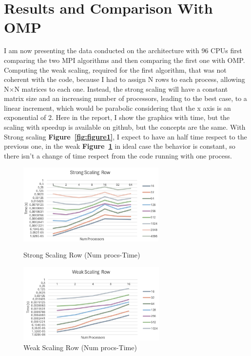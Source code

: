 \section{Results and Comparison With OMP}
I am now presenting the data conducted on the architecture with 96 CPUs first comparing the two MPI algorithms and then comparing the first one with OMP. Computing the weak scaling, required for the first algorithm, that was not coherent with the code, because I had to assign N rows to each process, allowing N$\times$N matrices to each one. Instead, the strong scaling will have a constant matrix size and an increasing number of processors, leading to the best case, to a linear increment, which would be parabolic considering that the x axis is an exponential of 2. Here in the report, I show the graphics with time, but the scaling with speedup is available on github, but the concepts are the same. With Strong scaling \textbf{Figure~\ref{fig:figure1}}, I expect to have an half time respect to the previous one, in the weak \textbf{Figure~\ref{fig:figure2}} in ideal case the behavior is constant, so there isn't a change of time respect from the code running with one process. 
\begin{figure}[h!]
    \centering
    \begin{minipage}[b]{1.0\columnwidth}
        \centering
        \includegraphics[width=\textwidth,height=4cm,keepaspectratio=false]{images/1.02 Strong Scaling Row.png}
        \caption{Strong Scaling Row (Num procs-Time)}
        \label{fig:figure1}
    \end{minipage}
    \hfill
    \begin{minipage}[b]{1.0\columnwidth}
        \centering
        \includegraphics[width=\textwidth,height=4cm,keepaspectratio=false]{images/1.03 Weak Scaling Row.png}
        \caption{Weak Scaling Row (Num procs-Time)}
        \label{fig:figure2}
    \end{minipage}
\end{figure}
